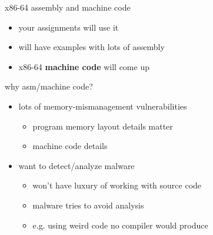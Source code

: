 \begin{frame}{x86-64 assembly and machine code}
    \begin{itemize}
    \item your assignments will use it
    \item will have examples with lots of assembly
    \item x86-64 \textbf{machine code} will come up
    \end{itemize}
\end{frame}

\begin{frame}{why asm/machine code?}
    \begin{itemize}
    \item lots of memory-mismanagement vulnerabilities
        \begin{itemize}
        \item program memory layout details matter
        \item machine code details
        \end{itemize}
    \item want to detect/analyze malware
        \begin{itemize}
        \item won't have luxury of working with source code
        \item malware tries to avoid analysis
        \item e.g. using weird code no compiler would produce
        \end{itemize}
    \end{itemize}
\end{frame}


